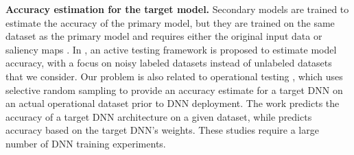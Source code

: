\documentclass{article}
\begin{document}
\textbf{Accuracy estimation for the target model.}
Secondary models are trained to estimate the accuracy of the primary model, but
they are trained on the same dataset as the primary model and requires 
either the
original input data \cite{mpp_2019} or saliency maps \cite{DNN_AccuracyPrediction_SaliencyMaps_Failures_AutonomousDriving_ZhangyangWang_TAMU_ICML_Workshop_2019_mohseni2019predicting}.
 In \cite{active_testing_accuacy_2018},  an active testing framework is
 proposed to estimate model accuracy,
  with a focus on
  noisy labeled datasets instead of
  unlabeled datasets
 that we consider.
Our problem is also related to operational testing \cite{DNN_Operational_Testing_NJU_FSE_2019_10.1145/3338906.3338930},
which uses selective random sampling
to provide an accuracy estimate for a target
DNN on an actual operational dataset prior to DNN deployment.
The work \cite{DNN_AccuracyPrediction_TAPAS_Architecture_Accuracy_Predictor_AAAI_2019_istrate2019tapas}
predicts the accuracy of a target DNN architecture on
a given dataset, while \cite{DNN_AccuracyPrediction_Weights_GoogleBrain_2020_unterthiner2020predicting}
predicts accuracy based on the target DNN's weights.
These studies
require a large number of DNN training experiments.
\end{document}
